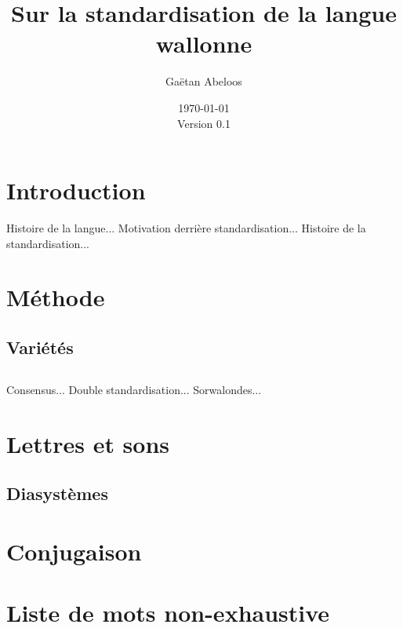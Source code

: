 \documentclass[french]{article}
\begin{document}
\title{Sur la standardisation de la langue wallonne}
\author{Gaëtan Abeloos}
\date{\today\\Version 0.1}

\maketitle

\section{Introduction}

Histoire de la langue...
Motivation derrière standardisation...
Histoire de la standardisation...

\section{Méthode}

\subsection{Variétés}
\subsection{}
Consensus...
Double standardisation...
Sorwalondes...

\section{Lettres et sons}

\subsection{Diasystèmes}

\section{Conjugaison}

\section{Liste de mots non-exhaustive}
\end{document}
